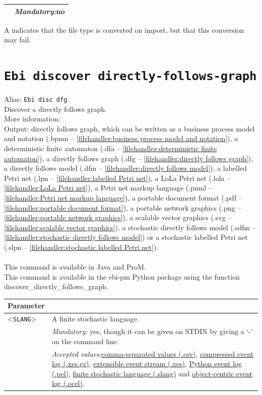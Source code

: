 {\begin{tabularx}{\linewidth}{lX}
&\textit{Mandatory:}\quad no\\
\bottomrule
\end{tabularx}
A \textdagger{} indicates that the file type is converted on import, but that this conversion may fail.
\clearpage\section{\texttt{Ebi discover directly-follows-graph}}
\label{command:Ebi discover directly-follows-graph}
Alias: \texttt{Ebi disc dfg}.\\
Discover a directly follows graph.\\
More information: ~\cite{DBLP:conf/icpm/LeemansPW19}~\\
\noindent Output: directly follows graph, which can be written as a business process model and notation (.bpmn -- \cref{filehandler:business process model and notation}), a deterministic finite automaton (.dfa -- \cref{filehandler:deterministic finite automaton}), a directly follows graph (.dfg -- \cref{filehandler:directly follows graph}), a directly follows model (.dfm -- \cref{filehandler:directly follows model}), a labelled Petri net (.lpn -- \cref{filehandler:labelled Petri net}), a LoLa Petri net (.lola -- \cref{filehandler:LoLa Petri net}), a Petri net markup language (.pnml -- \cref{filehandler:Petri net markup language}), a portable document format (.pdf -- \cref{filehandler:portable document format}), a portable network graphics (.png -- \cref{filehandler:portable network graphics}), a scalable vector graphics (.svg -- \cref{filehandler:scalable vector graphics}), a stochastic directly follows model (.sdfm -- \cref{filehandler:stochastic directly follows model}) or a stochastic labelled Petri net (.slpn -- \cref{filehandler:stochastic labelled Petri net}).\\
\\This command is available in Java and ProM.
\\This command is available in the ebi-pm Python package using the function discover\_directly\_follows\_graph.
\begin{tabularx}{\linewidth}{lX}
\toprule
Parameter \\\midrule
<\texttt{SLANG}>&A finite stochastic language.\\
&\textit{Mandatory:} \quad yes, though it can be given on STDIN by giving a `-' on the command line.\\
&\textit{Accepted values:}\quad \hyperref[filehandler:comma-separated values]{comma-separated values (.csv)}, \hyperref[filehandler:compressed event log]{compressed event log (.xes.gz)}, \hyperref[filehandler:extensible event stream]{extensible event stream (.xes)}, \hyperref[filehandler:Python event log]{Python event log (.pel)}, \hyperref[filehandler:finite stochastic language]{finite stochastic language (.slang)} and \hyperref[filehandler:object-centric event log]{object-centric event log (.ocel)}.\\

\end{tabularx}}
